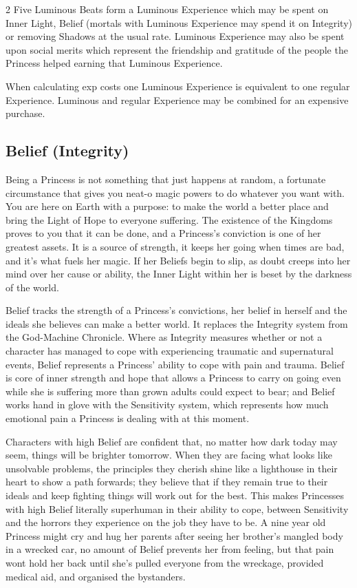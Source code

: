 \begin{multicols}{2}
Five Luminous Beats form a Luminous Experience which may be spent on Inner Light, Belief (mortals with Luminous Experience may spend it on Integrity) or removing Shadows at the usual rate. Luminous Experience may also be spent upon social merits which represent the friendship and gratitude of the people the Princess helped earning that Luminous Experience. 

When calculating exp costs one Luminous Experience is equivalent to one regular Experience. Luminous and regular Experience may be combined for an expensive purchase. 

\subsection*{Belief (Integrity)}
\label{subsec:Belief} 
\noindent Being a Princess is not something that just happens at random, a fortunate circumstance that gives you neat-o magic powers to do whatever you want with. You are here on Earth with a purpose: to make the world a better place and bring the Light of Hope to everyone suffering. The existence of the Kingdoms proves to you that it can be done, and a Princess's conviction is one of her greatest assets. It is a source of strength, it keeps her going when times are bad, and it's what fuels her magic. If her Beliefs begin to slip, as doubt creeps into her mind over her cause or ability, the Inner Light within her is beset by the darkness of the world.

Belief tracks the strength of a Princess's convictions, her belief in herself and the ideals she believes can make a better world. It replaces the Integrity system from the God-Machine Chronicle. Where as Integrity measures whether or not a character has managed to cope with experiencing traumatic and supernatural events, Belief represents a Princess' ability to cope with pain and trauma. Belief is core of inner strength and hope that allows a Princess to carry on going even while she is suffering more than grown adults could expect to bear; and Belief works hand in glove with the Sensitivity system, which represents how much emotional pain a Princess is dealing with at this moment. 

Characters with high Belief are confident that, no matter how dark today may seem, things will be brighter tomorrow. When they are facing what looks like unsolvable problems, the principles they cherish shine like a lighthouse in their heart to show a path forwards; they believe that if they remain true to their ideals and keep fighting things will work out for the best. This makes Princesses with high Belief literally superhuman in their ability to cope, between Sensitivity and the horrors they experience on the job they have to be. A nine year old Princess might cry and hug her parents after seeing her brother's mangled body in a wrecked car, no amount of Belief prevents her from feeling, but that pain wont hold her back until she's pulled everyone from the wreckage, provided medical aid, and organised the bystanders.


\end{multicols}
